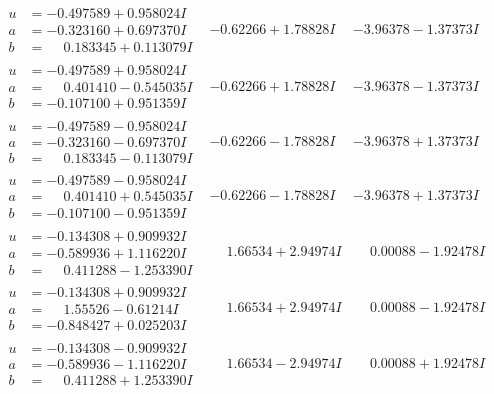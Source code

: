 \documentclass[1p]{elsarticle_modified}
\theoremstyle{definition}
\begin{document}
$$\begin{array}{c|c|c}
\begin{aligned}
u &= -0.497589 + 0.958024 I \\
a &= -0.323160 + 0.697370 I \\
b &= \phantom{-}0.183345 + 0.113079 I\end{aligned}
 & -0.62266 + 1.78828 I & -3.96378 - 1.37373 I \\ \hline\begin{aligned}
u &= -0.497589 + 0.958024 I \\
a &= \phantom{-}0.401410 - 0.545035 I \\
b &= -0.107100 + 0.951359 I\end{aligned}
 & -0.62266 + 1.78828 I & -3.96378 - 1.37373 I \\ \hline\begin{aligned}
u &= -0.497589 - 0.958024 I \\
a &= -0.323160 - 0.697370 I \\
b &= \phantom{-}0.183345 - 0.113079 I\end{aligned}
 & -0.62266 - 1.78828 I & -3.96378 + 1.37373 I \\ \hline\begin{aligned}
u &= -0.497589 - 0.958024 I \\
a &= \phantom{-}0.401410 + 0.545035 I \\
b &= -0.107100 - 0.951359 I\end{aligned}
 & -0.62266 - 1.78828 I & -3.96378 + 1.37373 I \\ \hline\begin{aligned}
u &= -0.134308 + 0.909932 I \\
a &= -0.589936 + 1.116220 I \\
b &= \phantom{-}0.411288 - 1.253390 I\end{aligned}
 & \phantom{-}1.66534 + 2.94974 I & \phantom{-}0.00088 - 1.92478 I \\ \hline\begin{aligned}
u &= -0.134308 + 0.909932 I \\
a &= \phantom{-}1.55526 - 0.61214 I \\
b &= -0.848427 + 0.025203 I\end{aligned}
 & \phantom{-}1.66534 + 2.94974 I & \phantom{-}0.00088 - 1.92478 I \\ \hline\begin{aligned}
u &= -0.134308 - 0.909932 I \\
a &= -0.589936 - 1.116220 I \\
b &= \phantom{-}0.411288 + 1.253390 I\end{aligned}
 & \phantom{-}1.66534 - 2.94974 I & \phantom{-}0.00088 + 1.92478 I \\ \hline\begin{aligned}

\end{aligned}
\end{array}$$
\end{document}
